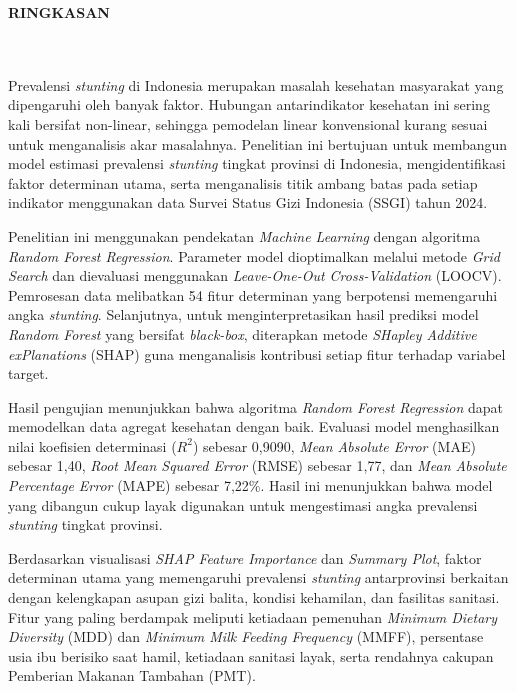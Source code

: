 \clearpage
{}%
\thispagestyle{fancy}

\begin{center}
    \large \bfseries \MakeUppercase{Ringkasan}\\
    \normalsize \normalfont {\thetitle}\\
    \normalsize \normalfont {\theauthor}\\
    \bigskip
\end{center}

\normalsize \normalfont \justifying
Prevalensi \textit{stunting} di Indonesia merupakan masalah kesehatan masyarakat yang dipengaruhi oleh banyak faktor. Hubungan antarindikator kesehatan ini sering kali bersifat non-linear, sehingga pemodelan linear konvensional kurang sesuai untuk menganalisis akar masalahnya. Penelitian ini bertujuan untuk membangun model estimasi prevalensi \textit{stunting} tingkat provinsi di Indonesia, mengidentifikasi faktor determinan utama, serta menganalisis titik ambang batas pada setiap indikator menggunakan data Survei Status Gizi Indonesia (SSGI) tahun 2024.

Penelitian ini menggunakan pendekatan \textit{Machine Learning} dengan algoritma \textit{Random Forest Regression}. Parameter model dioptimalkan melalui metode \textit{Grid Search} dan dievaluasi menggunakan \textit{Leave-One-Out Cross-Validation} (LOOCV). Pemrosesan data melibatkan 54 fitur determinan yang berpotensi memengaruhi angka \textit{stunting}. Selanjutnya, untuk menginterpretasikan hasil prediksi model \textit{Random Forest} yang bersifat \textit{black-box}, diterapkan metode \textit{SHapley Additive exPlanations} (SHAP) guna menganalisis kontribusi setiap fitur terhadap variabel target.

Hasil pengujian menunjukkan bahwa algoritma \textit{Random Forest Regression} dapat memodelkan data agregat kesehatan dengan baik. Evaluasi model menghasilkan nilai koefisien determinasi ($R^2$) sebesar 0,9090, \textit{Mean Absolute Error} (MAE) sebesar 1,40, \textit{Root Mean Squared Error} (RMSE) sebesar 1,77, dan \textit{Mean Absolute Percentage Error} (MAPE) sebesar 7,22\%. Hasil ini menunjukkan bahwa model yang dibangun cukup layak digunakan untuk mengestimasi angka prevalensi \textit{stunting} tingkat provinsi.

Berdasarkan visualisasi \textit{SHAP Feature Importance} dan \textit{Summary Plot}, faktor determinan utama yang memengaruhi prevalensi \textit{stunting} antarprovinsi berkaitan dengan kelengkapan asupan gizi balita, kondisi kehamilan, dan fasilitas sanitasi. Fitur yang paling berdampak meliputi ketiadaan pemenuhan \textit{Minimum Dietary Diversity} (MDD) dan \textit{Minimum Milk Feeding Frequency} (MMFF), persentase usia ibu berisiko saat hamil, ketiadaan sanitasi layak, serta rendahnya cakupan Pemberian Makanan Tambahan (PMT).

